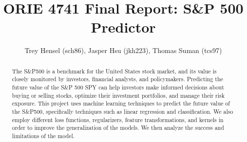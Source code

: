 \documentclass[final,5p,times,twocolumn,authoryear, 12pt]{elsarticle}
\begin{document}
\begin{frontmatter}



\title{\bf ORIE 4741 Final Report: S\&P 500 Predictor}


\author{Trey Hensel (sch86), Jasper Hsu (jkh223), Thomas Suman (tcs97)}


\begin{abstract}
The S\&P500 is a benchmark for the United States stock market, and its value is closely monitored by investors, financial analysts, and policymakers. Predicting the future value of the S\&P 500 SPY can help investors make informed decisions about buying or selling stocks, optimize their investment portfolios, and manage their risk exposure. This project uses machine learning techniques to predict the future value of the S\&P500, specifically techniques such as linear regression and classification. We also employ different loss functions, regularizers, feature transformations, and kernels in order to improve the generalization of the models. We then analyze the success and limitations of the model.

\end{abstract}






\end{frontmatter}
\end{document}

